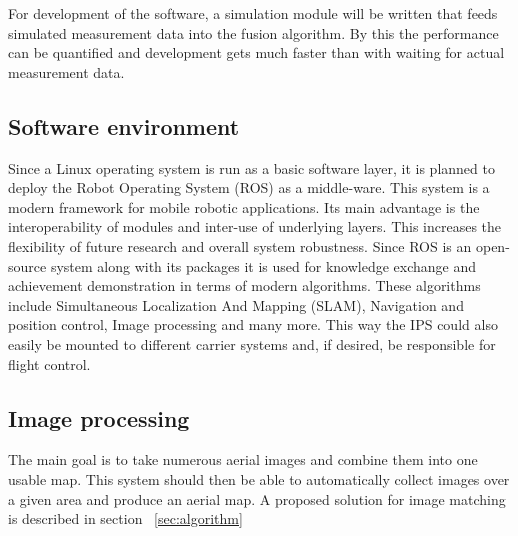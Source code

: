 \documentclass[fontsize=11pt,paper=a4,]{scrartcl}
\begin{document}
For development of the software, a simulation module will be written that feeds simulated measurement data into the fusion algorithm.
By this the performance can be quantified and development gets much faster than with waiting for actual measurement data. 


\FloatBarrier
\subsection{Software environment}
Since a Linux operating system is run as a basic software layer, it is planned to deploy the Robot Operating System (ROS) as a middle-ware. This system is a modern framework
for mobile robotic applications. Its main advantage is the interoperability of modules and inter-use of underlying 
layers. This increases the flexibility of future research and overall system robustness. Since ROS is an open-source system along with its packages it is used for knowledge exchange and achievement demonstration in terms of modern algorithms. These algorithms include Simultaneous Localization
And Mapping (SLAM), Navigation and position control, Image processing and many more. This way the IPS could also easily be mounted to different carrier systems and, if desired, be responsible for flight control.

\subsection{Image processing}
The main goal is to take numerous aerial images and combine them into one usable map. This system should then be able
to automatically collect images over a given area and produce an aerial map. A proposed solution
for image matching is described in section ~\ref{sec:algorithm}
\end{document}
